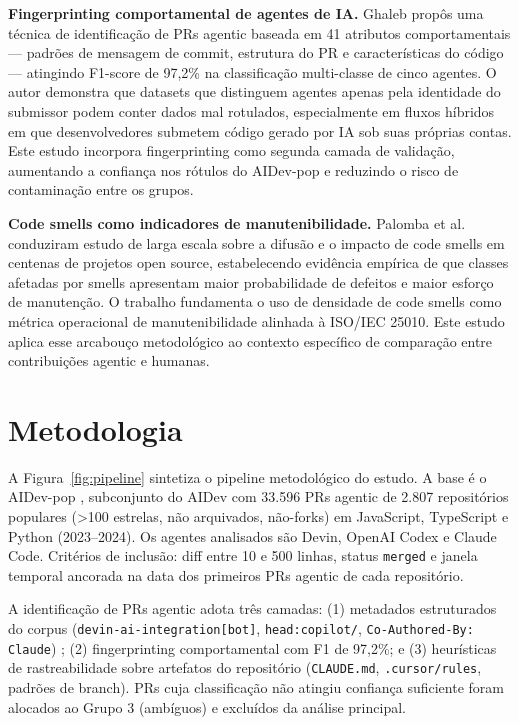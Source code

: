 \documentclass[12pt]{article}
\begin{document}
\textbf{Fingerprinting comportamental de agentes de IA.} Ghaleb
\cite{ghaleb:26} propôs uma técnica de identificação de PRs agentic
baseada em 41 atributos comportamentais --- padrões de mensagem de commit,
estrutura do PR e características do código --- atingindo F1-score de
97,2\% na classificação multi-classe de cinco agentes. O autor demonstra
que datasets que distinguem agentes apenas pela identidade do submissor
podem conter dados mal rotulados, especialmente em fluxos híbridos em que
desenvolvedores submetem código gerado por IA sob suas próprias contas.
Este estudo incorpora fingerprinting como segunda camada de validação,
aumentando a confiança nos rótulos do AIDev-pop e reduzindo o risco de
contaminação entre os grupos.

\textbf{Code smells como indicadores de manutenibilidade.} Palomba et al.\
\cite{palomba:18} conduziram estudo de larga escala sobre a difusão e o
impacto de code smells em centenas de projetos open source,
estabelecendo evidência empírica de que classes afetadas por smells
apresentam maior probabilidade de defeitos e maior esforço de manutenção.
O trabalho fundamenta o uso de densidade de code smells como métrica
operacional de manutenibilidade alinhada à ISO/IEC 25010. Este estudo
aplica esse arcabouço metodológico ao contexto específico de comparação
entre contribuições agentic e humanas.


\section{Metodologia}
\label{sec:method}

A Figura~\ref{fig:pipeline} sintetiza o pipeline metodológico do estudo.
A base é o AIDev-pop \cite{li:25}, subconjunto do AIDev com 33.596 PRs
agentic de 2.807 repositórios populares (>100 estrelas, não arquivados,
não-forks) em JavaScript, TypeScript e Python (2023--2024). Os agentes
analisados são Devin, OpenAI Codex e Claude Code. Critérios de inclusão:
diff entre 10 e 500 linhas, status \texttt{merged} e janela temporal
ancorada na data dos primeiros PRs agentic de cada repositório.

A identificação de PRs agentic adota três camadas: (1) metadados
estruturados do corpus (\texttt{devin-ai-integration[bot]},
\texttt{head:copilot/}, \texttt{Co-Authored-By: Claude}) \cite{li:25};
(2) fingerprinting comportamental \cite{ghaleb:26} com F1 de 97,2\%; e
(3) heurísticas de rastreabilidade \cite{mens:26} sobre artefatos do
repositório (\texttt{CLAUDE.md}, \texttt{.cursor/rules}, padrões de branch).
PRs cuja classificação não atingiu confiança suficiente foram alocados ao
Grupo 3 (ambíguos) e excluídos da análise principal.
\end{document}
